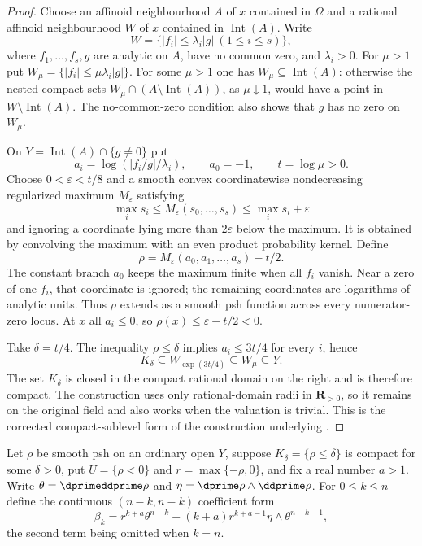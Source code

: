 \begin{proof}
Choose an affinoid neighbourhood $A$ of $x$ contained in $\Omega$ and a
rational affinoid neighbourhood $W$ of $x$ contained in
$\operatorname{Int}(A)$.  Write
\[
 W=\bigl\{|f_i|\leq\lambda_i|g|\ (1\leq i\leq s)\bigr\},
\]
where $f_1,\ldots,f_s,g$ are analytic on $A$, have no common zero, and
$\lambda_i>0$.  For $\mu>1$ put
$W_\mu=\{|f_i|\leq\mu\lambda_i|g|\}$.  For some $\mu>1$ one has
$W_\mu\subseteq\operatorname{Int}(A)$: otherwise the nested compact sets
$W_\mu\cap(A\setminus\operatorname{Int}(A))$, as $\mu\downarrow1$, would
have a point in $W\setminus\operatorname{Int}(A)$.  The no-common-zero
condition also shows that $g$ has no zero on $W_\mu$.

On $Y=\operatorname{Int}(A)\cap\{g\ne0\}$ put
\[
 a_i=\log(|f_i/g|/\lambda_i),\qquad a_0=-1,
 \qquad t=\log\mu>0.
\]
Choose $0<\varepsilon<t/8$ and a smooth convex coordinatewise nondecreasing
regularized maximum $M_\varepsilon$ satisfying
\[
 \max_i s_i\leq M_\varepsilon(s_0,\ldots,s_s)
       \leq\max_i s_i+\varepsilon
\]
and ignoring a coordinate lying more than $2\varepsilon$ below the maximum.
It is obtained by convolving the maximum with an even product probability
kernel.  Define
\[
             \rho=M_\varepsilon(a_0,a_1,\ldots,a_s)-t/2.
\]
The constant branch $a_0$ keeps the maximum finite when all $f_i$ vanish.
Near a zero of one $f_i$, that coordinate is ignored; the remaining
coordinates are logarithms of analytic units.  Thus $\rho$ extends as a
smooth psh function across every numerator-zero locus.  At $x$ all
$a_i\leq0$, so $\rho(x)\leq\varepsilon-t/2<0$.

Take $\delta=t/4$.  The inequality $\rho\leq\delta$ implies
$a_i\leq3t/4$ for every $i$, hence
\[
 K_\delta\subseteq W_{\exp(3t/4)}\subseteq W_\mu\subseteq Y.
\]
The set $K_\delta$ is closed in the compact rational domain on the right and
is therefore compact.  The construction uses only rational-domain radii in
$\mathbf R_{>0}$, so it remains on the original field and also works when
the valuation is trivial.  This is the corrected compact-sublevel form of
the construction underlying \cite[Proposition~16.9.1]{CLD25}.
\end{proof}

\begin{definition}
\label{def:ch16-weight-forms}
Let $\rho$ be smooth psh on an ordinary open $Y$, suppose
$K_\delta=\{\rho\leq\delta\}$ is compact for some $\delta>0$, put
$U=\{\rho<0\}$ and $r=\max\{-\rho,0\}$, and fix a real number $a>1$.
Write $\theta=\dprimeddprime\rho$ and
$\eta=\dprime\rho\wedge\ddprime\rho$.  For $0\leq k\leq n$ define the
continuous $(n-k,n-k)$ coefficient form
\begin{equation}
\label{eq:ch16-beta-k}
 \beta_k=r^{k+a}\theta^{n-k}
   +(k+a)r^{k+a-1}\eta\wedge\theta^{n-k-1},
\end{equation}
the second term being omitted when $k=n$.
\end{definition}

